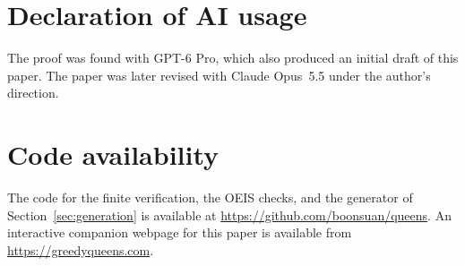 \section*{Declaration of AI usage}
The proof was found with GPT-6 Pro, which also produced an initial
draft of this paper. The paper was later revised with Claude Opus~5.5
under the author's direction.

\section*{Code availability}
The code for the finite verification, the OEIS checks, and the
generator of Section~\ref{sec:generation} is available at
\url{https://github.com/boonsuan/queens}.
An interactive companion webpage for this paper is available from
\url{https://greedyqueens.com}.